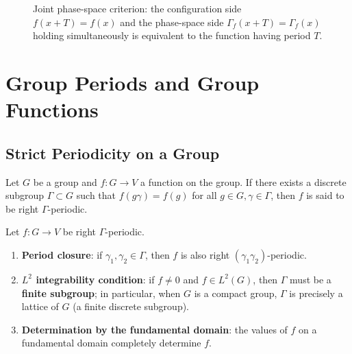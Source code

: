 \begin{figure}[htbp]
\centering
{}
\caption{Joint phase-space criterion: the configuration side $f(x+T)=f(x)$ and the phase-space side $\Gamma_f(x+T)=\Gamma_f(x)$ holding simultaneously is equivalent to the function having period $T$.}
\label{fig:phase_group_criterion}
\end{figure}

\section{\texorpdfstring{Group Periods and Group Functions}{Group Periods and Group Functions}}

\subsection{Strict Periodicity on a Group}

\begin{definition}\label{def:group_strict_period}
Let $G$ be a group and $f: G \to V$ a function on the group. If there exists a discrete subgroup $\Gamma \subset G$ such that $f(g\gamma) = f(g)$ for all $g \in G, \gamma \in \Gamma$, then $f$ is said to be right $\Gamma$-periodic.
\end{definition}

\begin{proposition}\label{prop:group_period_properties}
Let $f: G \to V$ be right $\Gamma$-periodic.
\begin{enumerate}[label=(\roman*)]
    \item \textbf{Period closure}: if $\gamma_1, \gamma_2 \in \Gamma$, then $f$ is also right $(\gamma_1 \gamma_2)$-periodic.
    \item \textbf{$L^2$ integrability condition}: if $f \neq 0$ and $f \in L^2(G)$, then $\Gamma$ must be a \textbf{finite subgroup}; in particular, when $G$ is a compact group, $\Gamma$ is precisely a lattice of $G$ (a finite discrete subgroup).
    \item \textbf{Determination by the fundamental domain}: the values of $f$ on a fundamental domain completely determine $f$.
\end{enumerate}
\end{proposition}

